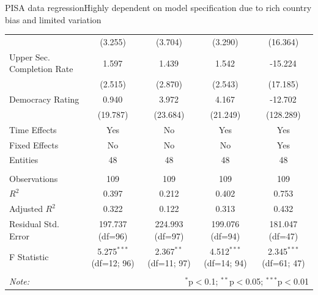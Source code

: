 \documentclass[10pt]{beamer}
\begin{document}
\begin{frame}{PISA data regression}{Highly dependent on model specification due to rich country bias and limited variation}
\begin{table}[!htbp]
{\begin{tabular}{@{\extracolsep{2pt}}lcccc}
                & (3.255) & (3.704) & (3.290) & (16.364) \\
                 Upper Sec. Completion Rate & 1.597$^{}$ & 1.439$^{}$ & 1.542$^{}$ & -15.224$^{}$ \\
                & (2.515) & (2.870) & (2.543) & (17.185) \\
                 Democracy Rating & 0.940$^{}$ & 3.972$^{}$ & 4.167$^{}$ & -12.702$^{}$ \\
                & (19.787) & (23.684) & (21.249) & (128.289) \\
                 Time Effects & Yes & No & Yes & Yes \\
                 Fixed Effects & No & No & No & Yes \\
                 Entities & 48 & 48 & 48 & 48 \\
                \hline \\[-1.8ex]
                 Observations & 109 & 109 & 109 & 109 \\
                 $R^2$ & 0.397 & 0.212 & 0.402 & 0.753 \\
                 Adjusted $R^2$ & 0.322 & 0.122 & 0.313 & 0.432 \\
                 Residual Std. Error & 197.737 (df=96) & 224.993 (df=97) & 199.076 (df=94) & 181.047 (df=47) \\
                 F Statistic & 5.275$^{***}$ (df=12; 96) & 2.367$^{**}$ (df=11; 97) & 4.512$^{***}$ (df=14; 94) & 2.345$^{***}$ (df=61; 47) \\
                \hline
                \hline \\[-1.8ex]
                \textit{Note:} & \multicolumn{4}{r}{$^{*}$p$<$0.1; $^{**}$p$<$0.05; $^{***}$p$<$0.01} \\
                \end{tabular}
        }
        \end{table}
\end{frame}
\end{document}
